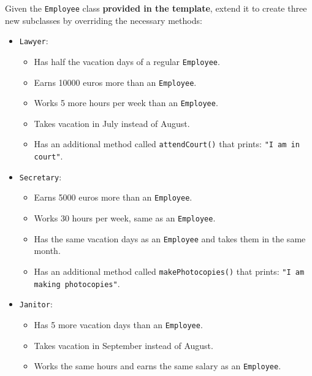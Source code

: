 Given the \texttt{Employee} class \textbf{provided in the template}, extend it to create three new subclasses by overriding the necessary methods:

\begin{itemize}

    \item \texttt{Lawyer}:

        \begin{itemize}

            \item Has half the vacation days of a regular \texttt{Employee}.

            \item Earns 10000 euros more than an \texttt{Employee}.

            \item Works 5 more hours per week than an \texttt{Employee}.

            \item Takes vacation in July instead of August.

            \item Has an additional method called \texttt{attendCourt()} that prints: \texttt{"I am in court"}.

        \end{itemize}

    \item \texttt{Secretary}:

        \begin{itemize}

            \item Earns 5000 euros more than an \texttt{Employee}.

            \item Works 30 hours per week, same as an \texttt{Employee}.

            \item Has the same vacation days as an \texttt{Employee} and takes them in the same month.

            \item Has an additional method called \texttt{makePhotocopies()} that prints: \texttt{"I am making photocopies"}.

        \end{itemize}

    \item \texttt{Janitor}:

        \begin{itemize}

            \item Has 5 more vacation days than an \texttt{Employee}.

            \item Takes vacation in September instead of August.

            \item Works the same hours and earns the same salary as an \texttt{Employee}.

        \end{itemize}

\end{itemize}

